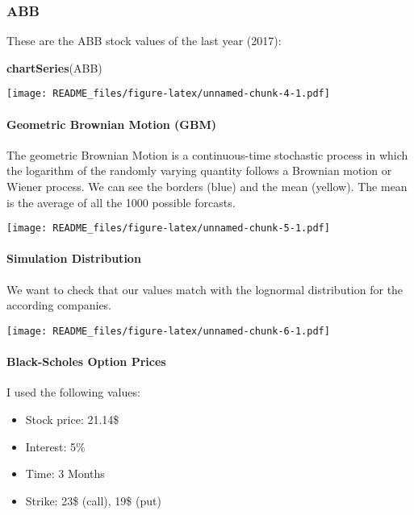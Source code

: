 \documentclass[]{article}
\newenvironment{Shaded}{\begin{snugshade}}{\end{snugshade}}
\newcommand{\KeywordTok}[1]{\textcolor[rgb]{0.13,0.29,0.53}{\textbf{#1}}}
\newcommand{\NormalTok}[1]{#1}
\providecommand{\tightlist}{%
  \setlength{\itemsep}{0pt}\setlength{\parskip}{0pt}}
\let\oldparagraph\paragraph
\renewcommand{\paragraph}[1]{\oldparagraph{#1}\mbox{}}
\begin{document}
\subsubsection{ABB}\label{abb}

These are the ABB stock values of the last year (2017):

\begin{Shaded}
\begin{Highlighting}[]
\KeywordTok{chartSeries}\NormalTok{(ABB)}
\end{Highlighting}
\end{Shaded}

\texttt{[image: README\_files/figure-latex/unnamed-chunk-4-1.pdf]}

\paragraph{Geometric Brownian Motion
(GBM)}\label{geometric-brownian-motion-gbm}

The geometric Brownian Motion is a continuous-time stochastic process in
which the logarithm of the randomly varying quantity follows a Brownian
motion or Wiener process. We can see the borders (blue) and the mean
(yellow). The mean is the average of all the 1000 possible forcasts.

\texttt{[image: README\_files/figure-latex/unnamed-chunk-5-1.pdf]}

\paragraph{Simulation Distribution}\label{simulation-distribution}

We want to check that our values match with the lognormal distribution
for the according companies.

\texttt{[image: README\_files/figure-latex/unnamed-chunk-6-1.pdf]}

\paragraph{Black-Scholes Option
Prices}\label{black-scholes-option-prices}

I used the following values:

\begin{itemize}
\tightlist
\item
  Stock price: 21.14\$
\item
  Interest: 5\%
\item
  Time: 3 Months
\item
  Strike: 23\$ (call), 19\$ (put)
\end{itemize}
\end{document}
